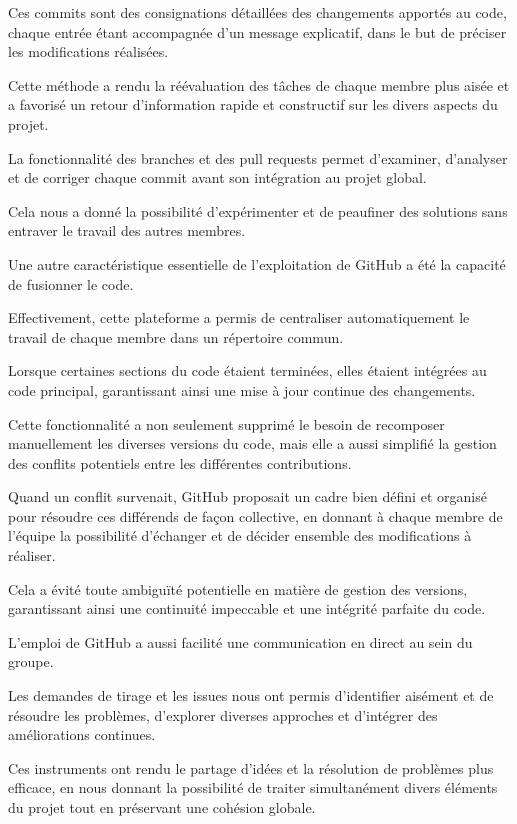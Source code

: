 \documentclass[
]{article}
\begin{document}
Ces commits sont des consignations détaillées des changements apportés
au code, chaque entrée étant accompagnée d'un message explicatif, dans
le but de préciser les modifications réalisées.

Cette méthode a rendu la réévaluation des tâches de chaque membre plus
aisée et a favorisé un retour d'information rapide et constructif sur
les divers aspects du projet.

La fonctionnalité des branches et des pull requests permet d'examiner,
d'analyser et de corriger chaque commit avant son intégration au projet
global.

Cela nous a donné la possibilité d'expérimenter et de peaufiner des
solutions sans entraver le travail des autres membres.

Une autre caractéristique essentielle de l'exploitation de GitHub a été
la capacité de fusionner le code.

Effectivement, cette plateforme a permis de centraliser automatiquement
le travail de chaque membre dans un répertoire commun.

Lorsque certaines sections du code étaient terminées, elles étaient
intégrées au code principal, garantissant ainsi une mise à jour continue
des changements.

Cette fonctionnalité a non seulement supprimé le besoin de recomposer
manuellement les diverses versions du code, mais elle a aussi simplifié
la gestion des conflits potentiels entre les différentes contributions.

Quand un conflit survenait, GitHub proposait un cadre bien défini et
organisé pour résoudre ces différends de façon collective, en donnant à
chaque membre de l'équipe la possibilité d'échanger et de décider
ensemble des modifications à réaliser.

Cela a évité toute ambiguïté potentielle en matière de gestion des
versions, garantissant ainsi une continuité impeccable et une intégrité
parfaite du code.

L'emploi de GitHub a aussi facilité une communication en direct au sein
du groupe.

Les demandes de tirage et les issues nous ont permis d'identifier
aisément et de résoudre les problèmes, d'explorer diverses approches et
d'intégrer des améliorations continues.

Ces instruments ont rendu le partage d'idées et la résolution de
problèmes plus efficace, en nous donnant la possibilité de traiter
simultanément divers éléments du projet tout en préservant une cohésion
globale.
\end{document}
